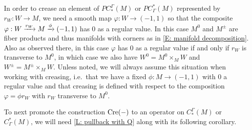 \begin{convention}\label{C: regular value setup}
In order to crease an element of $PC_*^\Gamma(M)$ or $PC^*_\Gamma(M)$ represented by $r_W \colon W \to M$, we need a smooth map $\varphi \colon W \to (-1,1)$ so that the composite $\varphi: W \xrightarrow{r_W}M \xrightarrow{\phi} (-1,1)$ has $0$ as a regular value. In this case $M^0$ and $M^\pm$ are fiber products and thus manifolds with corners as in \cref{E: manifold decomposition}. Also as observed there, in this case $\varphi$ has $0$ as a regular value if and only if $r_W$ is transverse to $M^0$, in which case we also have $W^0 = M^0 \times_M W$ and $W^\pm = M^\pm \times_M W$. Unless noted, we will always assume this situation when working with creasing, i.e.\ that we have a fixed $\phi \colon M \to (-1,1)$ with $0$ a regular value and that creasing is defined with respect to the composition $\varphi = \phi r_W$ with $r_W$ transverse to $M^0$.
\end{convention}

To next promote the construction $\mathrm{Cre}(-)$ to an operator on $C_*^{\Gamma}(M)$ or $C^*_\Gamma(M)$, we will need \cref{L: pullback with Q} along with its following corollary.

